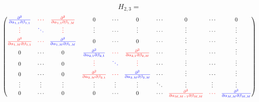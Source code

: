 \documentclass[11pt]{book}
\begin{document}
$$ H_{2,3} = $$
\begin{equation}
\begin{pmatrix}
\textcolor{blue}{\frac{\partial^2 } {\partial \alpha_{1,1} \partial \beta_{1,1} }          } 
&
 \textcolor{red}{\cdots }
& 
 \textcolor{red}{\frac{\partial^2 }{\partial \alpha_{1,1} \partial \beta_{1,M} } } 
&
0 & \cdots & 0 & 
\cdots & 0 & 
 \cdots 
&
  0      
\\%
\textcolor{red}{\vdots  }     &  \textcolor{blue}{\ddots }  & \textcolor{red}{\vdots} & \vdots & \cdots & \vdots   & \cdots & \vdots & \cdots & \vdots  
\\%
\textcolor{red}{\frac{\partial^2 }{\partial \alpha_{1,M} \partial \beta_{1,1} } } & 
\textcolor{red}{\cdots}  & 
\textcolor{blue}{\frac{\partial^2 }{\partial \alpha_{1,M} \partial \beta_{1,M} }} & 
 0 & \cdots & 0 & \cdots   & \vdots & \cdots & \vdots     
\\%
0  & 
\cdots & 0 & 
\textcolor{blue}{\frac{\partial^2 } {\partial \alpha_{2,1} \partial \beta_{2,1} }} &
\textcolor{red}{\cdots} & 
\textcolor{red}{\frac{\partial^2 } {\partial \alpha_{2,1} \partial \beta_{2,M} }}      & 
\cdots & \vdots & \cdots & \vdots
\\%
0  & 
\cdots & 0 & 
\textcolor{red}{\vdots} &
\textcolor{blue}{\ddots }& 
\textcolor{red}{\vdots } & 
\cdots & \vdots & \cdots & \vdots
\\ %
0 &
\cdots & 0 & 
\textcolor{red}{\frac{\partial^2 } {\partial \alpha_{2,M} \partial \beta_{2,1} }} &
\textcolor{red}{\cdots} & 
\textcolor{blue}{\frac{\partial^2 } {\partial \alpha_{2,M} \partial \beta_{2,M} }}      & 
\cdots & \vdots & \cdots & \vdots
\\ %
\vdots    &
\vdots & 
\vdots      & 
\vdots & \vdots & \vdots & \ddots &
\vdots & 
\vdots & 
\vdots
\\ %
0      & 
\cdots & 
0      & 
0 & 
\cdots & 
0  & \cdots &
\textcolor{red}{\frac{\partial^2 } {\partial \alpha_{M,M-1} \partial \beta_{M,M} }} &
\textcolor{red}{\cdots} & 
\textcolor{blue}{\frac{\partial^2 } {\partial \alpha_{M,M} \partial \beta_{M,M} }}
\end{pmatrix}
\end{equation}
\end{document}
